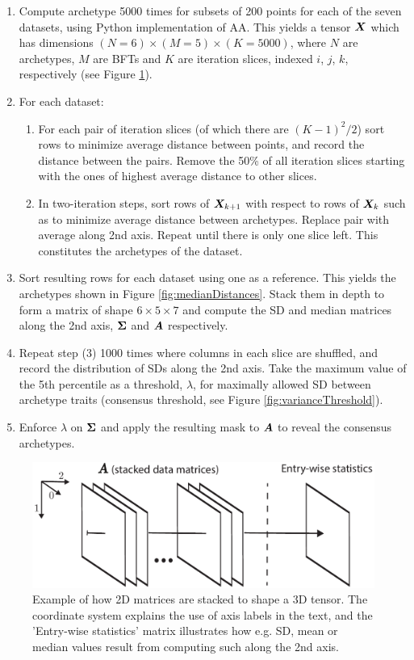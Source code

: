 \begin{enumerate}
	\item Compute archetype 5000 times for subsets of 200 points for each of the seven datasets, using Python implementation of AA. This yields a tensor $\bm{X}$ which has dimensions $(N=6) \times (M=5) \times (K=5000)$, where $N$ are archetypes, $M$ are BFTs and $K$ are iteration slices, indexed $i$, $j$, $k$, respectively (see Figure \ref{fig:entryWiseStatistics}).
	\item For each dataset:
	\begin{enumerate}
		\item For each pair of iteration slices (of which there are $(K-1)^2/2$) sort rows to minimize average distance between points, and record the distance between the pairs. Remove the 50\% of all iteration slices starting with the ones of highest average distance to other slices.
		\item In two-iteration steps, sort rows of $\bm{X}_{k+1}$ with respect to rows of $\bm{X}_{k}$ such as to minimize average distance between archetypes. Replace pair with average along 2nd axis. Repeat until there is only one slice left. This constitutes the archetypes of the dataset.
	\end{enumerate} 
	\item Sort resulting rows for each dataset using one as a reference. This yields the archetypes shown in Figure \ref{fig:medianDistances}. Stack them in depth to form a matrix of shape $6 \times 5 \times 7$ and compute the SD and median matrices along the 2nd axis, $\bm{\Sigma}$ and $\bm{A}$ respectively.
	\item Repeat step (3) 1000 times where columns in each slice are shuffled, and record the distribution of SDs along the 2nd axis. Take the maximum value of the 5th percentile as a threshold, $\lambda$, for maximally allowed SD between archetype traits (consensus threshold, see Figure \ref{fig:varianceThreshold}).
	\item Enforce $\lambda$ on $\bm{\Sigma}$ and apply the resulting mask to $\bm{A}$ to reveal the consensus archetypes.
\end{enumerate}

\begin{figure}
	\centering
	\includegraphics[width=1\textwidth]{figures/entryWiseStatistics}
	\caption{\label{fig:entryWiseStatistics} Example of how 2D matrices are stacked to shape a 3D tensor. The coordinate system explains the use of axis labels in the text, and the 'Entry-wise statistics' matrix illustrates how e.g. SD, mean or median values result from computing such along the 2nd axis.}
\end{figure}

